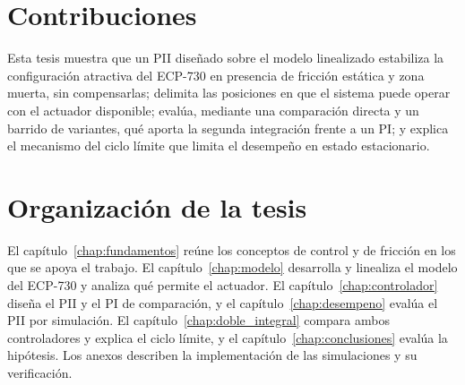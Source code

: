 \section{Contribuciones}

Esta tesis muestra que un PII diseñado sobre el modelo linealizado estabiliza la configuración atractiva del ECP-730 en presencia de fricción estática y zona muerta, sin compensarlas; delimita las posiciones en que el sistema puede operar con el actuador disponible; evalúa, mediante una comparación directa y un barrido de variantes, qué aporta la segunda integración frente a un PI; y explica el mecanismo del ciclo límite que limita el desempeño en estado estacionario.

\section{Organización de la tesis}

El capítulo~\ref{chap:fundamentos} reúne los conceptos de control y de fricción en los que se apoya el trabajo. El capítulo~\ref{chap:modelo} desarrolla y linealiza el modelo del ECP-730 y analiza qué permite el actuador. El capítulo~\ref{chap:controlador} diseña el PII y el PI de comparación, y el capítulo~\ref{chap:desempeno} evalúa el PII por simulación. El capítulo~\ref{chap:doble_integral} compara ambos controladores y explica el ciclo límite, y el capítulo~\ref{chap:conclusiones} evalúa la hipótesis. Los anexos describen la implementación de las simulaciones y su verificación.
